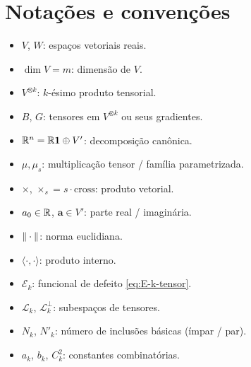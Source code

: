 \documentclass[tensorial.tex]{subfiles}
\providecommand{\sL}{\mathcal{L}}
\providecommand{\sLp}{\mathcal{L}^\perp}
\begin{document}
\section{Notações e convenções}

\begin{itemize}[leftmargin=2em,nosep]
  \item $V$, $W$: espaços vetoriais reais.
  \item $\dim V = m$: dimensão de $V$.
  \item $V^{\otimes k}$: $k$-ésimo produto tensorial.
  \item $B$, $G$: tensores em $V^{\otimes k}$ ou seus gradientes.
  \item $\mathbb{R}^n = \mathbb{R} \mathbf{1} \oplus V'$: decomposição canônica.
  \item $\mu, \mu_s$: multiplicação tensor / família parametrizada.
  \item $\times$, $\times_s = s \cdot \mathrm{cross}$: produto vetorial.
  \item $a_0 \in \mathbb{R}$, $\boldsymbol{a} \in V'$: parte real / imaginária.
  \item $\| \cdot \|$: norma euclidiana.
  \item $\langle \cdot, \cdot\rangle$: produto interno.
  \item $\mathcal{E}_k$: funcional de defeito \eqref{eq:E-k-tensor}.
  \item $\sL_k$, $\sLp_k$: subespaços de tensores.
  \item $N_k$, $N'_k$: número de inclusões básicas (ímpar / par).
  \item $a_k$, $b_k$, $C_k^2$: constantes combinatórias.
\end{itemize}
\end{document}
